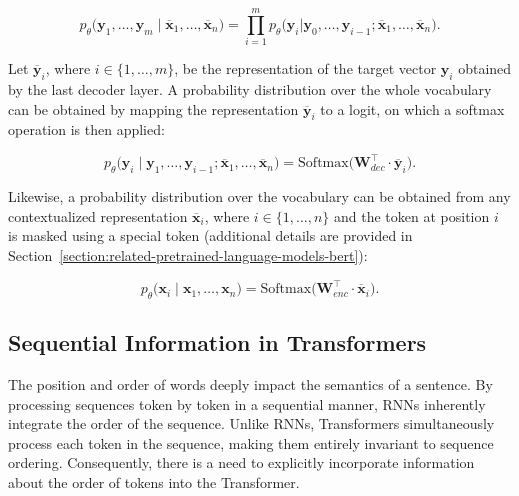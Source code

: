 \begin{equation}
    p_{\theta} \bigl( \bm{y}_1, \ldots, \bm{y}_m \mid \overline{\bm{x}}_1, \ldots, \overline{\bm{x}}_n \bigr) = \prod_{i=1}^{m} p_{\theta}\bigl(\bm{y}_i |\bm{y}_0, \ldots, \bm{y}_{i-1}; \overline{\bm{x}}_1, \ldots, \overline{\bm{x}}_n\bigr).
\end{equation}

\noindent Let $\overline{\bm{y}}_i$, where $i \in \{1, \ldots, m\}$, be the representation of the target vector $\bm{y}_i$ obtained by the last decoder layer. A probability distribution over the whole vocabulary can be obtained by mapping the representation $\overline{\bm{y}}_i$ to a logit, on which a softmax operation is then applied:

\begin{equation}
    p_{\theta} \bigl( \bm{y}_i \mid \bm{y}_1, \ldots, \bm{y}_{i-1}; \overline{\bm{x}}_1, \ldots, \overline{\bm{x}}_n \bigr) = \text{Softmax}\bigl(\bm{W}_{dec}^{\top} \cdot \overline{\bm{y}}_i\bigr).
\end{equation}

\noindent Likewise, a probability distribution over the vocabulary can be obtained from any contextualized representation $\overline{\bm{x}}_i$, where $i \in \{1, \ldots, n\}$ and the token at position $i$ is masked using a special token (additional details are provided in Section~\ref{section:related-pretrained-language-models-bert}):

\begin{equation}
    p_{\theta} \bigl( \bm{x}_i \mid \bm{x}_1, \ldots, \bm{x}_{n} \bigr) = \text{Softmax}\bigl(\bm{W}_{enc}^{\top} \cdot \overline{\bm{x}}_i\bigr).
\end{equation}


\subsection{Sequential Information in Transformers}

The position and order of words deeply impact the semantics of a sentence. By processing sequences token by token in a sequential manner, \acp{RNN} inherently integrate the order of the sequence. Unlike \acp{RNN}, Transformers simultaneously process each token in the sequence, making them entirely invariant to sequence ordering. Consequently, there is a need to explicitly incorporate information about the order of tokens into the Transformer.



